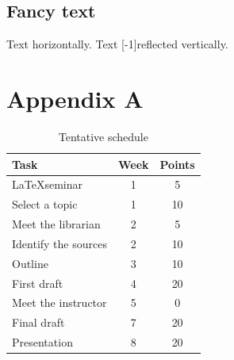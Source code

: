 \documentclass[nonacm]{acmart}
\begin{document}
\subsection{Fancy text}

Text  horizontally.
Text \scalebox{1}[-1]{reflected} vertically.




\clearpage
\section*{Appendix A}

\begin{table}[!htbp]
    \centering
    \caption{Tentative schedule}
    \label{tbl:schedule}
    \begin{tabular}{l c c}
        \hline
        Task                 & Week & Points \\
        \hline
        \LaTeX seminar       & 1    & 5      \\
        Select a topic       & 1    & 10     \\
        Meet the librarian   & 2    & 5      \\
        Identify the sources & 2    & 10     \\
        Outline              & 3    & 10     \\
        First draft          & 4    & 20     \\
        Meet the instructor  & 5    & 0      \\
        Final draft          & 7    & 20     \\
        Presentation         & 8    & 20     \\
        \hline
    \end{tabular}
\end{table}
\end{document}
